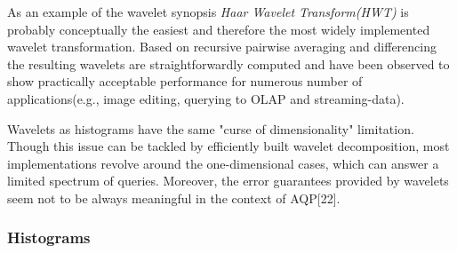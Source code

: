 \documentclass[10pt, conference, compsocconf]{IEEEtran}
\begin{document}
As an example of the wavelet synopsis \textit{Haar Wavelet Transform(HWT)} is probably conceptually the easiest and therefore the most widely implemented wavelet transformation. Based on recursive pairwise averaging and differencing the resulting wavelets are straightforwardly computed and have been observed to show practically acceptable performance for numerous number of applications(e.g., image editing, querying to OLAP and streaming-data).

Wavelets as histograms have the same "curse of dimensionality" limitation. Though this issue can be tackled by efficiently built wavelet decomposition, most implementations revolve around the one-dimensional cases, which can answer a limited spectrum of queries. Moreover, the error guarantees provided by wavelets seem not to be always meaningful in the context of AQP[22]. \\


\subsubsection{\textbf{Histograms}}
\end{document}
